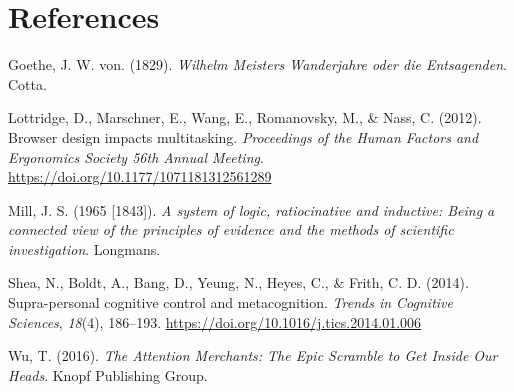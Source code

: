 \documentclass[a4paper, nobind]{templates/ociamthesis}
\newlength{\cslhangindent}
\newenvironment{CSLReferences}[2] %
 {%
  \setlength{\parindent}{0pt}
  \ifodd #1
  \let\oldpar\par
  \def\par{\hangindent=\cslhangindent\oldpar}
  \fi
  \setlength{\parskip}{1mm}
  \setlength{\baselineskip}{6mm}
 }%
 {}
\begin{document}
\hypertarget{references}{%
\chapter*{References}\label{references}}


\hypertarget{refs}{}
\begin{CSLReferences}{1}{0}
\leavevmode{}%
Goethe, J. W. von. (1829). \emph{Wilhelm {Meisters} {Wanderjahre} oder die {Entsagenden}}. Cotta.

\leavevmode{}%
Lottridge, D., Marschner, E., Wang, E., Romanovsky, M., \& Nass, C. (2012). {Browser design impacts multitasking}. \emph{Proceedings of the Human Factors and Ergonomics Society 56th Annual Meeting}. \url{https://doi.org/10.1177/1071181312561289}

\leavevmode{}%
Mill, J. S. (1965 {[}1843{]}). \emph{A system of logic, ratiocinative and inductive: Being a connected view of the principles of evidence and the methods of scientific investigation}. Longmans.

\leavevmode{}%
Shea, N., Boldt, A., Bang, D., Yeung, N., Heyes, C., \& Frith, C. D. (2014). {Supra-personal cognitive control and metacognition}. \emph{Trends in Cognitive Sciences}, \emph{18}(4), 186--193. \url{https://doi.org/10.1016/j.tics.2014.01.006}

\leavevmode{}%
Wu, T. (2016). \emph{{The Attention Merchants: The Epic Scramble to Get Inside Our Heads}}. Knopf Publishing Group.

\end{CSLReferences}

\end{document}

